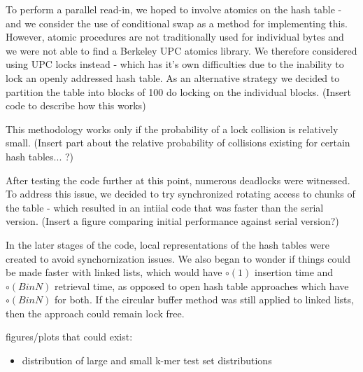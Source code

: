 \documentclass{article}
\begin{document}
\begin{enumerate}
 To perform a parallel read-in, we hoped to involve atomics on the hash table - and we consider the use of conditional swap as a method for implementing this. However, atomic procedures are not traditionally used for individual bytes and we were not able to find a Berkeley UPC atomics library. We therefore considered using UPC locks instead - which has it's own difficulties due to the inability to lock an openly addressed hash table. As an alternative strategy we decided to partition the table into blocks of 100 do locking on the individual blocks. ({\color{red}Insert code to describe how this works}) 

 This methodology works only if the probability of a lock collision is relatively small. ({\color{red}Insert part about the relative probability of collisions existing for certain hash tables... ?}) 


After testing the code further at this point, numerous deadlocks were witnessed. To address this issue, we decided to try synchronized rotating access to chunks of the table - which resulted in an intiial code that was faster than the serial version. ({\color{red}Insert a figure comparing initial performance against serial version?})

In the later stages of the code, local representations of the hash tables were created to avoid synchornization issues. We also began to wonder if things could be  made faster with linked lists, which would have $\circ (1)$ insertion time and $\circ(BinN)$ retrieval time, as opposed to open hash table approaches which have $\circ (BinN)$ for both. If the circular buffer method was still applied to linked lists, then the approach could remain lock free. 



figures/plots that could exist:
\begin{itemize}
\item distribution of large and small k-mer test set distributions
\end{itemize}


\end{enumerate}
\end{document}
